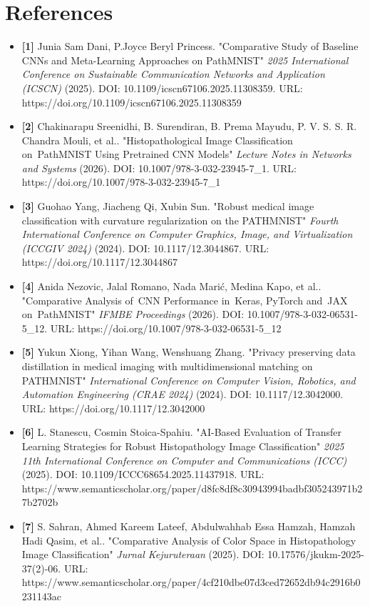 \documentclass[10pt]{article}
\begin{document}
\section{References}
\begin{itemize}
\item \textbf{[1]} Junia Sam Dani, P.Joyce Beryl Princess. "Comparative Study of Baseline CNNs and Meta-Learning Approaches on PathMNIST" \emph{2025 International Conference on Sustainable Communication Networks and Application (ICSCN)} (2025). DOI: 10.1109/icscn67106.2025.11308359. URL: https://doi.org/10.1109/icscn67106.2025.11308359
\item \textbf{[2]} Chakinarapu Sreenidhi, B. Surendiran, B. Prema Mayudu, P. V. S. S. R. Chandra Mouli, et al.. "Histopathological Image Classification on PathMNIST Using Pretrained CNN Models" \emph{Lecture Notes in Networks and Systems} (2026). DOI: 10.1007/978-3-032-23945-7\_1. URL: https://doi.org/10.1007/978-3-032-23945-7\_1
\item \textbf{[3]} Guohao Yang, Jiacheng Qi, Xubin Sun. "Robust medical image classification with curvature regularization on the PATHMNIST" \emph{Fourth International Conference on Computer Graphics, Image, and Virtualization (ICCGIV 2024)} (2024). DOI: 10.1117/12.3044867. URL: https://doi.org/10.1117/12.3044867
\item \textbf{[4]} Anida Nezovic, Jalal Romano, Nada Marić, Medina Kapo, et al.. "Comparative Analysis of CNN Performance in Keras, PyTorch and JAX on PathMNIST" \emph{IFMBE Proceedings} (2026). DOI: 10.1007/978-3-032-06531-5\_12. URL: https://doi.org/10.1007/978-3-032-06531-5\_12
\item \textbf{[5]} Yukun Xiong, Yihan Wang, Wenshuang Zhang. "Privacy preserving data distillation in medical imaging with multidimensional matching on PATHMNIST" \emph{International Conference on Computer Vision, Robotics, and Automation Engineering (CRAE 2024)} (2024). DOI: 10.1117/12.3042000. URL: https://doi.org/10.1117/12.3042000
\item \textbf{[6]} L. Stanescu, Cosmin Stoica-Spahiu. "AI-Based Evaluation of Transfer Learning Strategies for Robust Histopathology Image Classification" \emph{2025 11th International Conference on Computer and Communications (ICCC)} (2025). DOI: 10.1109/ICCC68654.2025.11437918. URL: https://www.semanticscholar.org/paper/d8fc8df8\allowbreak{}c3094399\allowbreak{}4badbf30\allowbreak{}5243971b\allowbreak{}27b2702b
\item \textbf{[7]} S. Sahran, Ahmed Kareem Lateef, Abdulwahhab Essa Hamzah, Hamzah Hadi Qasim, et al.. "Comparative Analysis of Color Space in Histopathology Image Classification" \emph{Jurnal Kejuruteraan} (2025). DOI: 10.17576/jkukm-2025-37(2)-06. URL: https://www.semanticscholar.org/paper/4cf210db\allowbreak{}e07d3ced\allowbreak{}72652db9\allowbreak{}4c2916b0\allowbreak{}231143ac

\end{itemize}
\end{document}

